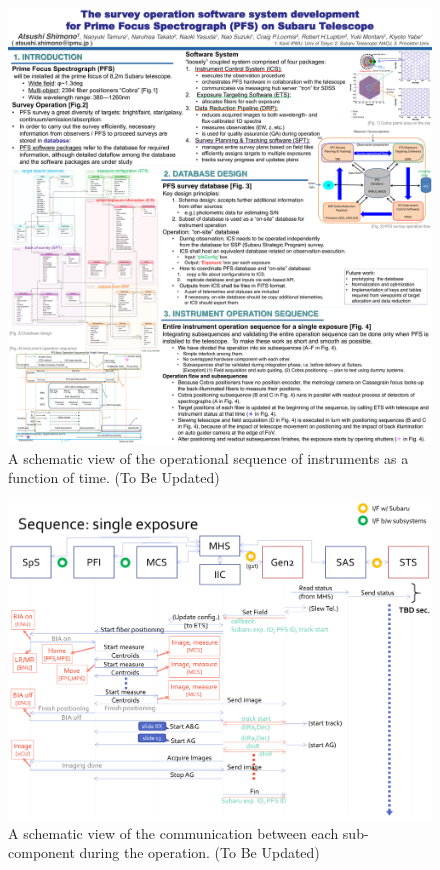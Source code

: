 \documentclass[a4paper]{article}
\begin{document}
\begin{figure}[!htb]
\begin{center}
\includegraphics[scale=0.5]{./figures/PFS_Operational_Sequence_for_Single_Exposure_SPIE2016.pdf}
\end{center}
\caption{A schematic view of the operational sequence of instruments as a function of time. (To Be Updated) \label{fig:single_exposure_sequence1}}
\end{figure}

\begin{figure}[!htb]
\begin{center}
\includegraphics[scale=0.2]{./figures/PFS_sequence_process.pdf}
\end{center}
\caption{A schematic view of the communication between each sub-component during the operation. (To Be Updated)\label{fig:single_exposure_sequence2}}
\end{figure}
\end{document}
